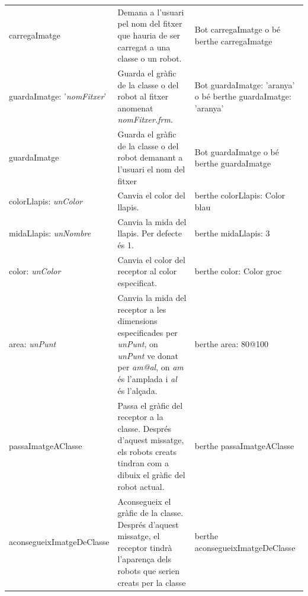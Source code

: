 {\begin{tabular}{p{35mm}p{65mm}p{40mm}}
\textsf{carregaImatge} & 
Demana a l'usuari pel nom del fitxer que hauria de ser carregat a una classe o un robot.
& \textsf{Bot carregaImatge} o bé \newline  \textsf{berthe carregaImatge} \\
\textsf{guardaImatge: '{\itshape nomFitxer}'} & 
Guarda el gràfic de la classe o del robot al fitxer anomenat \textsf{{\itshape nomFitxer.frm}}.
& \textsf{Bot guardaImatge: 'aranya'} \newline o bé \newline  \textsf{berthe guardaImatge: \newline \hspace*{25mm} 'aranya'} \\
\textsf{guardaImatge} & 
Guarda el gràfic de la classe o del robot demanant a l'usuari el nom del fitxer
& \textsf{Bot guardaImatge} o bé \newline  \textsf{berthe guardaImatge} \\
\textsf{colorLlapis: {\itshape unColor}} & 
Canvia el color del llapis.
& \textsf{berthe colorLlapis: Color blau} \\
\textsf{midaLlapis: {\itshape unNombre}} & 
Canvia la mida del llapis. Per defecte és 1.
& \textsf{berthe midaLlapis: 3} \\
\textsf{color: {\itshape unColor}} & 
Canvia el color del receptor al color especificat.
& \textsf{berthe color: Color groc} \\
\textsf{area: {\itshape unPunt}} & 
Canvia la mida del receptor a les dimensions especificades per \textsf{{\itshape unPunt}}, on
\textsf{{\itshape unPunt}} ve donat per \textsf{{\itshape am@al}}, on \textsf{{\itshape am}} és l'amplada i \textsf{{\itshape al}}
és l'alçada.
& \textsf{berthe area: 80@100} \\
\textsf{passaImatgeAClasse} & 
Passa el gràfic del receptor a la classe. Després d'aquest missatge, els robots creats tindran com
a dibuix el gràfic del robot actual.
& \textsf{berthe passaImatgeAClasse} \\
\textsf{aconsegueixImatgeDeClasse} & 
Aconsegueix el gràfic de la classe. Després d'aquest missatge, el receptor tindrà l'aparença dels robots
que serien creats per la classe
& \textsf{berthe \newline \hspace*{1mm} aconsegueixImatgeDeClasse} \\
\hline
\end{tabular}}




